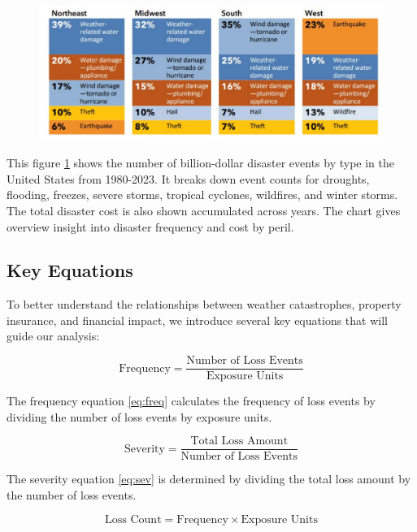 \documentclass[12pt]{article}
\begin{document}
\begin{figure}[ht]
    \centering
    \includegraphics[width=0.8\linewidth]{NAIC Property Threat by Regions.pdf}
    \label{fig:regional_disasters}
    \cite{naic}
\end{figure}

This figure \ref{fig:regional_disasters} shows the number of billion-dollar disaster events by type in the United States from 1980-2023. It breaks down event counts 
for droughts, flooding, freezes, severe storms, tropical cyclones, wildfires, and winter storms. The total disaster cost is also shown 
accumulated across years. The chart gives overview insight into disaster frequency and cost by peril.
    
\subsection{Key Equations}

To better understand the relationships between weather catastrophes, property insurance, and financial impact, we introduce several 
key equations that will guide our analysis:

\begin{equation}
    \label{eq:freq}
    \text{Frequency} = \frac{\text{Number of Loss Events}}{\text{Exposure Units}}
\end{equation}

The frequency equation \ref{eq:freq} calculates the frequency of loss events by dividing the number of loss events by exposure units.

\begin{equation}
    \label{eq:sev}
    \text{Severity} = \frac{\text{Total Loss Amount}}{\text{Number of Loss Events}}
\end{equation}

The severity equation \ref{eq:sev} is determined by dividing the total loss amount by the number of loss events.

\begin{equation}
    \label{eq:losscount}
    \text{Loss Count} = \text{Frequency} \times \text{Exposure Units}
\end{equation}
\end{document}
